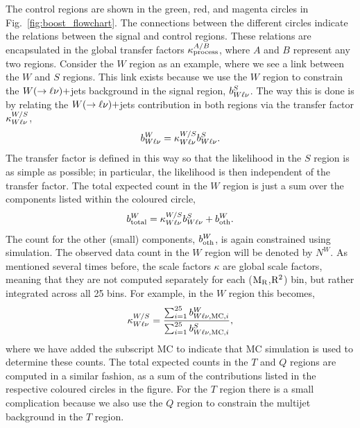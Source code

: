 The control regions are shown in the green, red, and magenta circles in
Fig.~\ref{fig:boost_flowchart}. The connections between the different circles indicate the
relations between the signal and control regions. These relations are encapsulated in the global
transfer factors $\kappa^{A/B}_{\rm process}$, where $A$ and $B$ represent any two regions. 
Consider the $W$ region as an example, where we see a link between the $W$ and $S$ regions. This
link exists because we use the $W$ region to constrain the $W(\rightarrow \ell\nu)+$jets background
in the signal region, $b^S_{W\ell\nu}$. The way this is done is by relating the $W(\rightarrow
\ell\nu)+$jets contribution in both regions via the transfer factor $\kappa^{W/S}_{W\ell\nu}$, 
\begin{equation}
  b^W_{W\ell\nu} = \kappa^{W/S}_{W\ell\nu} b^S_{W\ell\nu}  .
\end{equation}
The transfer factor is defined in this way so that the likelihood in the $S$ region is as simple
as possible; in particular, the likelihood is then independent of the transfer factor. 
The total expected count in the $W$ region is just a sum over the components listed within the
coloured circle, 
\begin{equation}
  b^W_{\rm total} = \kappa^{W/S}_{W\ell\nu} b^S_{W\ell\nu}  + b_{\rm oth}^W .
\end{equation}
The count for the other (small) components, $b_{\rm oth}^W$, is again constrained using
simulation.
The observed data count in the $W$ region will be denoted by $N^W$. 
As mentioned several times before, the scale factors $\kappa$ are global scale factors, meaning that
they are not computed separately for each ($\mathrm{M_R}$,$\mathrm{R^2}$) bin, but rather integrated across all 25
bins. For example, in the $W$ region this becomes,
\begin{equation}
  \kappa^{W/S}_{W\ell\nu} = \frac{ \sum_{i=1}^{25} b^W_{W\ell\nu, {\rm MC}, i}} {
\sum_{i=1}^{25} b^S_{W\ell\nu, {\rm MC}, i}} ,
\label{eq:kappa_example}
\end{equation}
where we have added the subscript MC to indicate that MC simulation is used to determine these
counts. 
The total expected counts in the $T$ and $Q$ regions are computed in a similar fashion, as a sum
of the contributions listed in the respective coloured circles in the figure. For the $T$ region
there is a small complication because we also use the $Q$ region to constrain the multijet
background in the $T$ region. 

